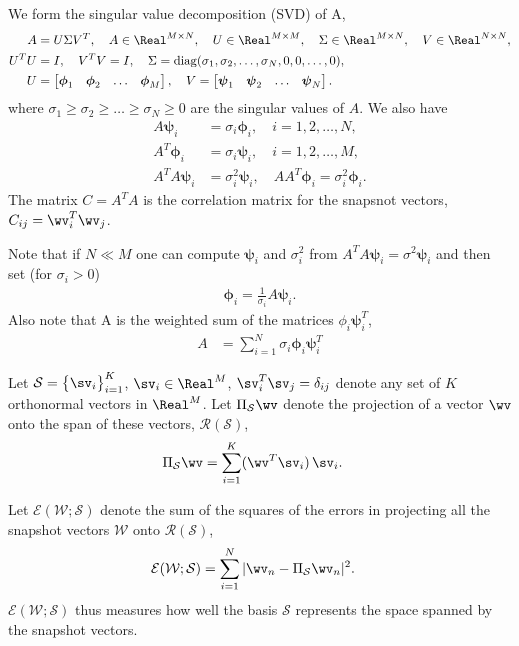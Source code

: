 \documentclass[11pt]{article}
\newcommand{\phiv}{\boldsymbol{\phi}}
\newcommand{\psiv}{\boldsymbol{\psi}}
\newcommand{\Ec}{{\mathcal E}}
\newcommand{\Rc}{\mathcal{R}}
\newcommand{\Sc}{\mathcal{S}}
\newcommand{\Wc}{\mathcal{W}}
\begin{document}
We form the singular value decomposition (SVD) of A,
\begin{align*}
   A &= U \Sigma V^T , \quad A\in\Real^{M\times N}, \quad U\in\Real^{M\times M}, \quad \Sigma\in\Real^{M\times N}, \quad V\in\Real^{N\times N},  \\
   U^T U &= I, \quad V^T V =I,  \quad \Sigma = {\rm diag}(\sigma_1, \sigma_2, \ldots, \sigma_N, 0, 0, \ldots, 0), \\
   U &= \begin{bmatrix} \phiv_1 & \phiv_2 & \ldots & \phiv_M \end{bmatrix}, \quad
   V = \begin{bmatrix} \psiv_1 & \psiv_2 & \ldots & \psiv_N \end{bmatrix}.
\end{align*}
where $\sigma_1\ge \sigma_2 \ge \ldots \ge \sigma_N \ge 0$ are the singular values of $A$.
We also have
\begin{align*}
    A \psiv_i &= \sigma_i \phiv_i,  \quad i=1,2,\ldots,N, \\
    A^T \phiv_i &= \sigma_i \psiv_i, \quad i=1,2,\ldots,M,  \\
   A^T A \psiv_i &= \sigma_i^2 \psiv_i, \quad A A^T \phiv_i =\sigma_i^2 \phiv_i. 
\end{align*}
The matrix $C=A^T A$ is the correlation matrix for the snapsnot vectors, $C_{ij} = \wv_i^T \wv_j$.

Note that if $N \ll M$ one can compute $\psiv_i$ and $\sigma_i^2$ from $A^T A \psiv_i = \sigma^2 \psiv_i $ and then set (for $\sigma_i>0$)
\begin{align*}
   \phiv_i = \frac{1}{\sigma_i} A \psiv_i. 
\end{align*}
Also note that A is the weighted sum of the matrices $\phi_i \psiv_i^T$, 
\begin{align*}
  A & = \sum_{i=1}^N   \sigma_i  \phiv_i \psiv_i^T
\end{align*}

Let $\Sc= \big\{\sv_i \big\}_{i=1}^K$, $\sv_i\in\Real^M$, $\sv_i^T\sv_j=\delta_{ij}$ denote any set of $K$ orthonormal vectors in $\Real^M$.
Let $\Pi_\Sc \wv$ denote the projection of a vector $\wv$ onto the span of these vectors, $\Rc(\Sc)$,
\begin{align*} 
   \Pi_\Sc \wv & = \sum_{i=1}^K (\wv^T\sv_i)\, \sv_i . 
\end{align*}

Let $\Ec(\Wc;\Sc)$ denote the sum of the squares of the errors in projecting all the snapshot vectors $\Wc$ onto $\Rc(\Sc)$, 
\begin{align*} 
   \Ec(\Wc;\Sc) &= \sum_{i=1}^N | \wv_n - \Pi_\Sc \wv_n |^2.  
\end{align*}
$\Ec(\Wc;\Sc)$ thus measures how well the basis $\Sc$ represents the space spanned by the snapshot vectors. 
\end{document}
